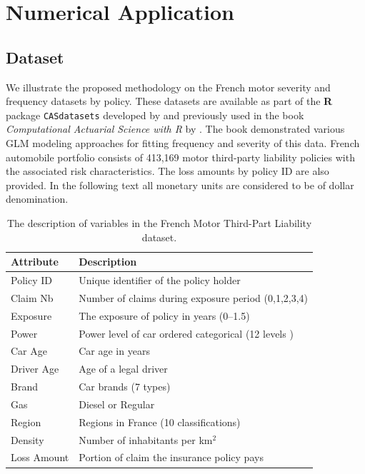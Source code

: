 \documentclass[11pt,letterpaper]{article}
\numberwithin{equation}{section}
\numberwithin{equation}{section}
\numberwithin{equation}{section}
\begin{document}
\section{Numerical Application}
\subsection{Dataset}
We illustrate the proposed methodology on the French motor severity and frequency datasets by policy. These datasets are available as part of the {\bf R} package {\tt CASdatasets} developed by \citep{Dutang+Charpentier:2016} and previously used in the book {\it Computational Actuarial Science with R} by \cite{Charpentier:2014}. The book demonstrated various GLM modeling approaches for fitting frequency and severity of this data. French automobile portfolio consists of 413,169 motor third-party liability policies with the associated risk characteristics. The loss amounts by policy ID are also provided. In the following text all monetary units are considered to be of dollar denomination.
\begin{small}
\begin{table}[!htb]
\begin{center}
    \caption{The description of variables in the French Motor Third-Part Liability dataset.}
      \centering
        \begin{tabular}{ll}
\hline
Attribute & Description \\
\hline
Policy ID & Unique identifier of the policy holder\\
Claim Nb & Number of claims during exposure period  (0,1,2,3,4)\\
Exposure & The exposure of policy in years (0--1.5) \\
Power & Power level of car ordered categorical (12 levels )\\
Car Age & Car age in years \\
Driver Age & Age of a legal driver \\
Brand & Car brands (7 types) \\
Gas & Diesel or Regular \\
Region & Regions in France (10 classifications)\\
Density & Number of inhabitants per km$^2$ \\
Loss Amount & Portion of claim the insurance policy pays\\
\hline
		\end{tabular}
\end{center}
\end{table}
\end{small}
\end{document}
